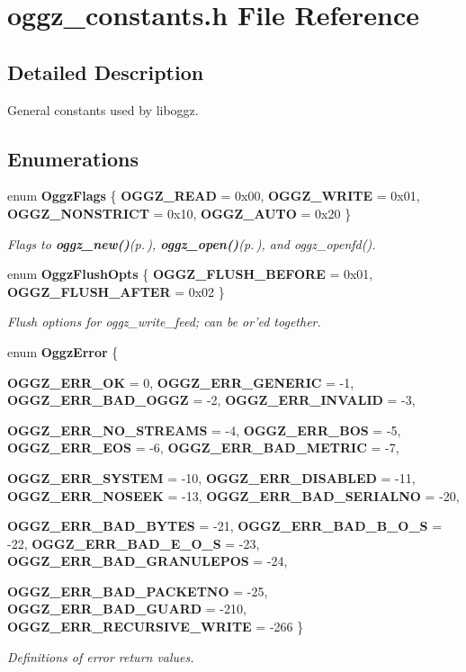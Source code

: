 \section{oggz\_\-constants.h File Reference}
\label{oggz__constants_8h}


\subsection{Detailed Description}
General constants used by liboggz. 



\subsection*{Enumerations}
\begin{CompactItemize}
\item 
enum {\bf Oggz\-Flags} \{ {\bf OGGZ\_\-READ} =  0x00, 
{\bf OGGZ\_\-WRITE} =  0x01, 
{\bf OGGZ\_\-NONSTRICT} =  0x10, 
{\bf OGGZ\_\-AUTO} =  0x20
 \}
\begin{CompactList}\small\item\em Flags to {\bf oggz\_\-new()}{\rm (p.\,\pageref{oggz_8h_a4})}, {\bf oggz\_\-open()}{\rm (p.\,\pageref{oggz_8h_a5})}, and oggz\_\-openfd(). \item\end{CompactList}\item 
enum {\bf Oggz\-Flush\-Opts} \{ {\bf OGGZ\_\-FLUSH\_\-BEFORE} =  0x01, 
{\bf OGGZ\_\-FLUSH\_\-AFTER} =  0x02
 \}
\begin{CompactList}\small\item\em Flush options for oggz\_\-write\_\-feed; can be or'ed together. \item\end{CompactList}\item 
enum {\bf Oggz\-Error} \{ \par
{\bf OGGZ\_\-ERR\_\-OK} =  0, 
{\bf OGGZ\_\-ERR\_\-GENERIC} =  -1, 
{\bf OGGZ\_\-ERR\_\-BAD\_\-OGGZ} =  -2, 
{\bf OGGZ\_\-ERR\_\-INVALID} =  -3, 
\par
{\bf OGGZ\_\-ERR\_\-NO\_\-STREAMS} =  -4, 
{\bf OGGZ\_\-ERR\_\-BOS} =  -5, 
{\bf OGGZ\_\-ERR\_\-EOS} =  -6, 
{\bf OGGZ\_\-ERR\_\-BAD\_\-METRIC} =  -7, 
\par
{\bf OGGZ\_\-ERR\_\-SYSTEM} =  -10, 
{\bf OGGZ\_\-ERR\_\-DISABLED} =  -11, 
{\bf OGGZ\_\-ERR\_\-NOSEEK} =  -13, 
{\bf OGGZ\_\-ERR\_\-BAD\_\-SERIALNO} =  -20, 
\par
{\bf OGGZ\_\-ERR\_\-BAD\_\-BYTES} =  -21, 
{\bf OGGZ\_\-ERR\_\-BAD\_\-B\_\-O\_\-S} =  -22, 
{\bf OGGZ\_\-ERR\_\-BAD\_\-E\_\-O\_\-S} =  -23, 
{\bf OGGZ\_\-ERR\_\-BAD\_\-GRANULEPOS} =  -24, 
\par
{\bf OGGZ\_\-ERR\_\-BAD\_\-PACKETNO} =  -25, 
{\bf OGGZ\_\-ERR\_\-BAD\_\-GUARD} =  -210, 
{\bf OGGZ\_\-ERR\_\-RECURSIVE\_\-WRITE} =  -266
 \}
\begin{CompactList}\small\item\em Definitions of error return values. \item\end{CompactList}\end{CompactItemize}


